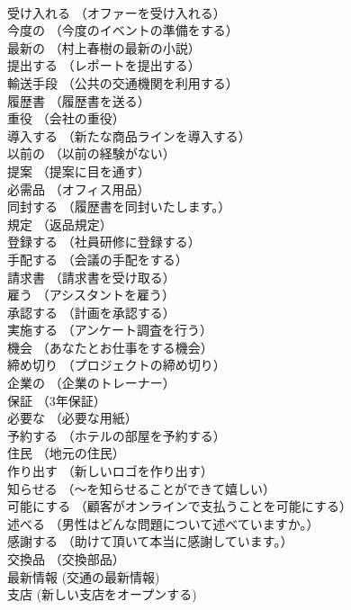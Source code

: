 \documentclass[8pt]{extreport}
\begin{document}
\begin{CJK}{UTF8}{min}
\\	受け入れる	（オファーを受け入れる）		
\\	今度の	（今度のイベントの準備をする）		
\\	最新の	（村上春樹の最新の小説）		
\\	提出する	（レポートを提出する）		
\\	輸送手段	（公共の交通機関を利用する）		
\\	履歴書	（履歴書を送る）		
\\	重役	（会社の重役）		
\\	導入する	（新たな商品ラインを導入する）		
\\	以前の	（以前の経験がない）		
\\	提案	（提案に目を通す）		
\\	必需品	（オフィス用品）		
\\	同封する	（履歴書を同封いたします。）		
\\	規定	（返品規定）		
\\	登録する	（社員研修に登録する）		
\\	手配する	（会議の手配をする）		
\\	請求書	（請求書を受け取る）		
\\	雇う	（アシスタントを雇う）		
\\	承認する	（計画を承認する）		
\\	実施する	（アンケート調査を行う）		
\\	機会	（あなたとお仕事をする機会）		
\\	締め切り	（プロジェクトの締め切り）		
\\	企業の	（企業のトレーナー）		
\\	保証	（3年保証）		
\\	必要な	（必要な用紙）		
\\	予約する	（ホテルの部屋を予約する）		
\\	住民	（地元の住民）		
\\	作り出す	（新しいロゴを作り出す）		
\\	知らせる	（～を知らせることができて嬉しい）		
\\	可能にする	（顧客がオンラインで支払うことを可能にする）		
\\	述べる	（男性はどんな問題について述べていますか。）		
\\	感謝する	（助けて頂いて本当に感謝しています。）		
\\	交換品	（交換部品）		
\\	最新情報	(交通の最新情報)		
\\	支店	(新しい支店をオープンする)		

\end{CJK}
\end{document}

